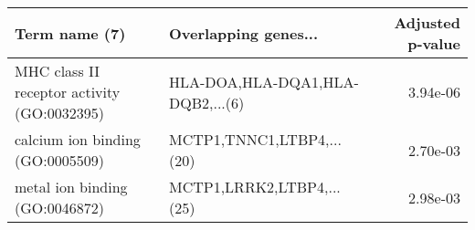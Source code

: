 \begin{tabular}{llr}
\toprule
                              Term name (7) &             Overlapping genes... &  Adjusted p-value \\
\midrule
MHC class II receptor activity (GO:0032395) & HLA-DOA,HLA-DQA1,HLA-DQB2,...(6) &          3.94e-06 \\
           calcium ion binding (GO:0005509) &        MCTP1,TNNC1,LTBP4,...(20) &          2.70e-03 \\
             metal ion binding (GO:0046872) &        MCTP1,LRRK2,LTBP4,...(25) &          2.98e-03 \\
\bottomrule
\end{tabular}
